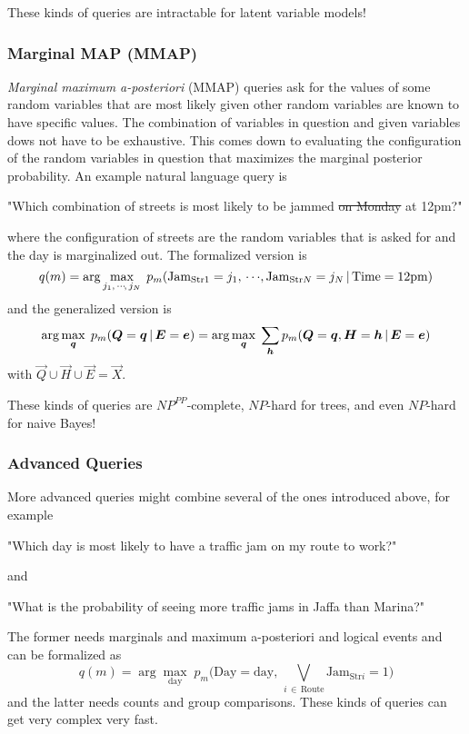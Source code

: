 				These kinds of queries are intractable for latent variable models!

			\subsubsection{Marginal MAP (MMAP)}
				\emph{Marginal maximum a-posteriori} (MMAP) queries ask for the values of some random variables that are most likely given other random variables are known to have specific values. The combination of variables in question and given variables dows not have to be exhaustive. This comes down to evaluating the configuration of the random variables in question that maximizes the marginal posterior probability. An example natural language query is
				\begin{center}
					"Which combination of streets is most likely to be jammed \sout{on Monday} at 12pm?"
				\end{center}
				where the configuration of streets are the random variables that is asked for and the day is marginalized out. The formalized version is
				\begin{equation}
					q(m) = \arg\max_{j_1,\,\cdots\!,\,j_N} \; p_m(\text{Jam}_{\text{Str}1} = j_1,\,\cdots\!,\text{Jam}_{\text{Str}N} = j_N \,\vert\, \text{Time} = \text{12pm})
				\end{equation}
				and the generalized version is
				\begin{equation}
					\arg\max_{\bm{q}} \; p_m(\bm{Q} = \bm{q} \,\vert\, \bm{E} = \bm{e})
					= \arg\max_{\bm{q}} \; \sum_{\bm{h}} p_m(\bm{Q} = \bm{q}, \bm{H} = \bm{h} \,\vert\, \bm{E} = \bm{e})
				\end{equation}
				with \( \vec{Q} \cup \vec{H} \cup \vec{E} = \vec{X} \).

				These kinds of queries are \( \mathit{NP}^\mathit{PP} \)-complete, \( \mathit{NP} \)-hard for trees, and even \(\mathit{NP}\)-hard for naive Bayes!

			\subsubsection{Advanced Queries}
				More advanced queries might combine several of the ones introduced above, for example
				\begin{center}
					"Which day is most likely to have a traffic jam on my route to work?"
				\end{center}
				and
				\begin{center}
					"What is the probability of seeing more traffic jams in Jaffa than Marina?"
				\end{center}
				The former needs marginals and maximum a-posteriori and logical events and can be formalized as
				\begin{equation}
					q(m) = \arg\max_{\text{day}} \; p_m\Big(\text{Day} = \text{day},\, \textstyle\bigvee_{i \,\in\, \text{Route}}\displaystyle \text{Jam}_{\text{Str}i} = 1\Big)
				\end{equation}
				and the latter needs counts and group comparisons. These kinds of queries can get very complex very fast.

